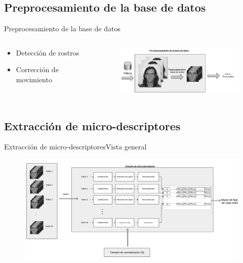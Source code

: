 \documentclass{beamer}
\begin{document}
    \subsection{Preprocesamiento de la base de datos}
        \begin{frame}{Preprocesamiento de la base de datos}
        
            \begin{columns}[onlytextwidth]
                \begin{column}{0.4\textwidth}
                    \begin{itemize}
                        \item Detección de rostros
                        \item Corrección de movimiento
                    \end{itemize}
                \end{column}
                \begin{column}{0.6\textwidth}
                    \begin{figure}[bt]
                		\centering
                        \includegraphics[width=7cm]{imagenes/Preprocesamiento.png}
                    \end{figure}
                \end{column}
            \end{columns}
        
        \end{frame}
    
    
    
    \subsection{Extracción de micro-descriptores}
        \begin{frame}{Extracción de micro-descriptores}{Vista general}
            \begin{figure}[bt]
        		\centering
                \includegraphics[width=12cm]{imagenes/Extractor_microdescriptores.png}
            \end{figure}
        \end{frame}
    
\end{document}
